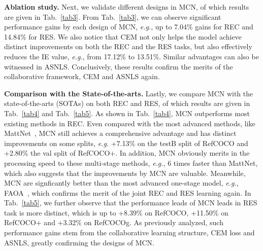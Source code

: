 \documentclass[10pt,twocolumn,letterpaper]{article}
\begin{document}
\textbf{Ablation study.} Next, we validate different designs in MCN, of which results are given in Tab.~\ref{tab3}. 
From Tab.~\ref{tab3}, we can  observe  significant performance gains by each design of MCN, \emph{e.g.}, up to 7.04\% gains for REC and 14.84\% for RES.
We also notice that CEM  not only helps the model achieve distinct improvements on both the REC and the RES tasks, but also  effectively reduces the IE value, \emph{e.g.}, from 17.12\% to  13.51\%.
Similar advantages can also be witnessed in ASNLS.
Conclusively, these results confirm the merits of the collaborative framework, CEM and ASNLS again.


\textbf{Comparison with the State-of-the-arts.} 
Lastly, we compare MCN with the state-of-the-arts (SOTAs) on both REC and RES, of which results are given in Tab.~\ref{tab4} and Tab.~\ref{tab5}.
As shown in Tab.~\ref{tab4}, MCN  outperforms most existing methods in REC.
Even compared with the most advanced methods, like MattNet~\cite{MATT:}, MCN still achieves a comprehensive advantage and has distinct improvements on some splits, \emph{e.g.} +7.13\% on the testB split of RefCOCO and +2.80\% the val split of RefCOCO+.
In addition, MCN obviously merits in the processing speed to these multi-stage methods, \emph{e.g.}, 6 times faster than MattNet, which also suggests that the improvements by MCN are valuable. 
Meanwhile, MCN are signficantly better than the most advanced one-stage model, \emph{e.g.}, FAOA~\cite{yang2019fast}, which confirms the merit of the joint REC and RES learning again. 
In Tab.~\ref{tab5}, we  further observe that the performance leads of MCN  leads in  RES task is more distinct, which is up to +8.39\% on RefCOCO, +11.50\% on RefCOCO+ and +3.32\% on RefCOCOg.
As previously analyzed, such performance gains stem from the collaborative learning structure, CEM loss and   ASNLS, greatly confirming the designs of MCN.
\end{document}
